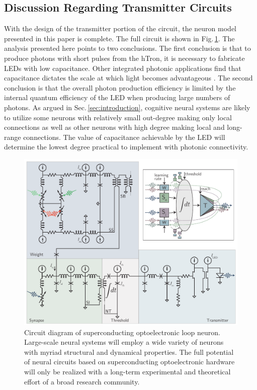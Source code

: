 \documentclass[aip,amsmath,amssymb,reprint,nofootinbib]{revtex4-1}
\begin{document}
\subsection{\label{sec:discussion_transmitterCircuits}Discussion Regarding Transmitter Circuits}
With the design of the transmitter portion of the circuit, the neuron model presented in this paper is complete. The full circuit is shown in Fig.\,\ref{fig:transmitters_fullCircuit}. The analysis presented here points to two conclusions. The first conclusion is that to produce photons with short pulses from the hTron, it is necessary to fabricate LEDs with low capacitance. Other integrated photonic applications find that capacitance dictates the scale at which light becomes advantageous \cite{mi2017}. The second conclusion is that the overall photon production efficiency is limited by the internal quantum efficiency of the LED when producing large numbers of photons. As argued in Sec.\,\ref{sec:introduction}, cognitive neural systems are likely to utilize some neurons with relatively small out-degree making only local connections as well as other neurons with high degree making local and long-range connections. The value of capacitance achievable by the LED will determine the lowest degree practical to implement with photonic connectivity.
\begin{figure}[t!]
	\centerline{\includegraphics[width=17.2cm]{_transmitters_fullCircuit_small.pdf}}
	\caption{\label{fig:transmitters_fullCircuit}Circuit diagram of superconducting optoelectronic loop neuron. Large-scale neural systems will employ a wide variety of neurons with myriad structural and dynamical properties. The full potential of neural circuits based on superconducting optoelectronic hardware will only be realized with a long-term experimental and theoretical effort of a broad research community.}
\end{figure}
\end{document}
